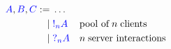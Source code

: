 \begin{definition}[Types]\label{def:nc-types}
  \[\!
    \begin{aligned}
      \ty{A}, \ty{B}, \ty{C}
           :=& \; \dots
      \\ \mid& \; \ty{\take[n]{A}} &&\text{pool of} \; n \; \text{clients}
      \\ \mid& \; \ty{\give[n]{A}} &&n \; \text{server interactions}
    \end{aligned}
  \]  
\end{definition}
